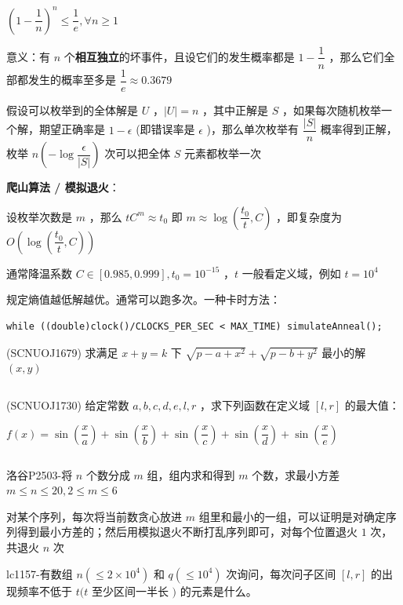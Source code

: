\documentclass[twocolumn,10pt]{ctexart}
\begin{document}
\begin{adjustbox}{max width=\linewidth,center}
$(1-\dfrac1n)^n\le\dfrac 1e,\forall n\ge 1$
\end{adjustbox}

意义：有 $n$ 个\textbf{相互独立}的坏事件，且设它们的发生概率都是 $1-\dfrac 1n$ ，那么它们全部都发生的概率至多是 $\dfrac1e\approx0.3679$

假设可以枚举到的全体解是 $U$ ，$|U|=n$ ，其中正解是 $S$ ，如果每次随机枚举一个解，期望正确率是 $1-\epsilon$ (即错误率是 $\epsilon$ )，那么单次枚举有 $\dfrac{|S|}n$ 概率得到正解，枚举 $n(-\log\dfrac\epsilon{|S|})$ 次可以把全体 $S$ 元素都枚举一次

\textbf{爬山算法 / 模拟退火}：

设枚举次数是 $m$ ，那么 $tC^m\approx t_0$ 即 $m\approx\log(\dfrac{t_0}t,C)$ ，即复杂度为 $O\left(\log(\dfrac{t_0}t,\allowbreak{}C)\right)$

通常降温系数 $C\in [0.985,\allowbreak{}0.999],\allowbreak{}t_0=10^{-15}$ ，$t$ 一般看定义域，例如 $t=10^4$

规定熵值越低解越优。通常可以跑多次。一种卡时方法：

\begin{verbatim}
while ((double)clock()/CLOCKS_PER_SEC < MAX_TIME) simulateAnneal();
\end{verbatim}

\begin{notebox}
(SCNUOJ1679) 求满足 $x+y=k$ 下 $\sqrt{p-a+x^2}+\sqrt{p-b+y^2}$ 最小的解 $(x,y)$
\end{notebox}

\inputminted{cpp}{code/ext_072.cpp}

\begin{notebox}
(SCNUOJ1730) 给定常数 $a,b,c,d,e,l,r$ ，求下列函数在定义域 $[l,r]$ 的最大值：

\begin{adjustbox}{max width=\linewidth,center}
$f(x)=\sin(\dfrac xa)+\sin(\dfrac xb)+\sin(\dfrac xc)+\sin(\dfrac xd)+\sin(\dfrac xe)$
\end{adjustbox}

\inputminted{cpp}{code/ext_073.cpp}

洛谷P2503-将 $n$ 个数分成 $m$ 组，组内求和得到 $m$ 个数，求最小方差 $m\le n\le20,2\le m\le6$

对某个序列，每次将当前数贪心放进 $m$ 组里和最小的一组，可以证明是对确定序列得到最小方差的；然后用模拟退火不断打乱序列即可，对每个位置退火 $1$ 次，共退火 $n$ 次

lc1157-有数组 $n(\le 2\times10^4)$ 和 $q(\le10^4)$ 次询问，每次问子区间 $[l,r]$ 的出现频率不低于 $t(t$ 至少区间一半长 $)$ 的元素是什么。
\end{notebox}
\end{document}
